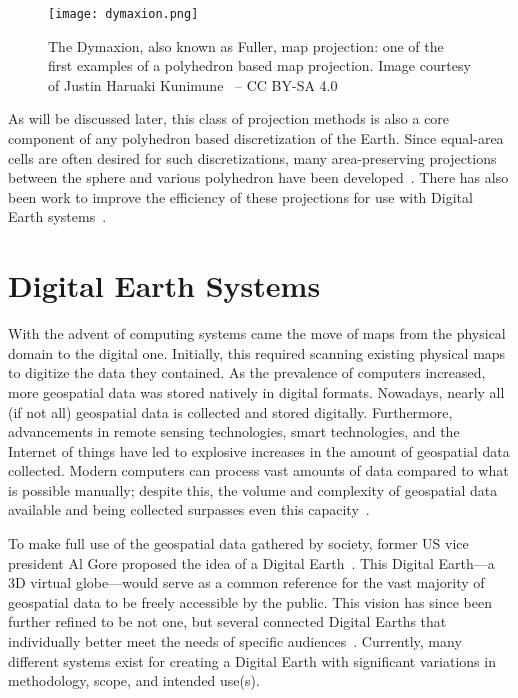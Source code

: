 \begin{figure}[h]
	\centering
	\texttt{[image: dymaxion.png]}
	\caption[The Dymaxion (or Fuller) Map Projection]{
		The Dymaxion, also known as Fuller, map projection: one of the first examples of a polyhedron based map projection.
		Image courtesy of Justin Haruaki Kunimune~\cite{dymaxion} -- CC BY-SA 4.0
	}
	\label{fig:poly-projection}
\end{figure}



As will be discussed later, this class of projection methods is also a core component of any polyhedron based discretization of the Earth.
Since equal-area cells are often desired for such discretizations, many area-preserving projections between the sphere and various polyhedron have been developed~\cite{bradley1946equal, snyder1992equal, van2006slice, rocsca2011uniform, rocsca2012area, holhocs2014octahedral}.
There has also been work to improve the efficiency of these projections for use with Digital Earth systems~\cite{harrison2011optimization}.


\section{Digital Earth Systems} \label{chap:2:DE}
With the advent of computing systems came the move of maps from the physical domain to the digital one.
Initially, this required scanning existing physical maps to digitize the data they contained.
As the prevalence of computers increased, more geospatial data was stored natively in digital formats.
Nowadays, nearly all (if not all) geospatial data is collected and stored digitally.
Furthermore, advancements in remote sensing technologies, smart technologies, and the Internet of things have led to explosive increases in the amount of geospatial data collected.
Modern computers can process vast amounts of data compared to what is possible manually; despite this, the volume and complexity of geospatial data available and being collected surpasses even this capacity~\cite{lee2015geospatial}.


To make full use of the geospatial data gathered by society, former US vice president Al Gore proposed the idea of a Digital Earth~\cite{gore1998}.
This Digital Earth---a 3D virtual globe---would serve as a common reference for the vast majority of geospatial data to be freely accessible by the public.
This vision has since been further refined to be not one, but several connected Digital Earths that individually better meet the needs of specific audiences~\cite{goodchild2012next}.
Currently, many different systems exist for creating a Digital Earth with significant variations in methodology, scope, and intended use(s).


